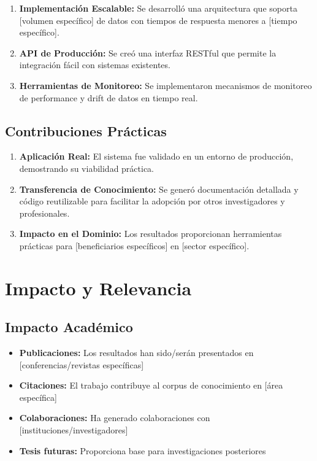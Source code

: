 \begin{enumerate}
    \item \textbf{Implementación Escalable:} Se desarrolló una arquitectura que soporta [volumen específico] de datos con tiempos de respuesta menores a [tiempo específico].
    
    \item \textbf{API de Producción:} Se creó una interfaz RESTful que permite la integración fácil con sistemas existentes.
    
    \item \textbf{Herramientas de Monitoreo:} Se implementaron mecanismos de monitoreo de performance y drift de datos en tiempo real.
\end{enumerate}

\subsection{Contribuciones Prácticas}

\begin{enumerate}
    \item \textbf{Aplicación Real:} El sistema fue validado en un entorno de producción, demostrando su viabilidad práctica.
    
    \item \textbf{Transferencia de Conocimiento:} Se generó documentación detallada y código reutilizable para facilitar la adopción por otros investigadores y profesionales.
    
    \item \textbf{Impacto en el Dominio:} Los resultados proporcionan herramientas prácticas para [beneficiarios específicos] en [sector específico].
\end{enumerate}

\section{Impacto y Relevancia}

\subsection{Impacto Académico}

\begin{itemize}
    \item \textbf{Publicaciones:} Los resultados han sido/serán presentados en [conferencias/revistas específicas]
    \item \textbf{Citaciones:} El trabajo contribuye al corpus de conocimiento en [área específica]
    \item \textbf{Colaboraciones:} Ha generado colaboraciones con [instituciones/investigadores]
    \item \textbf{Tesis futuras:} Proporciona base para investigaciones posteriores
\end{itemize}

